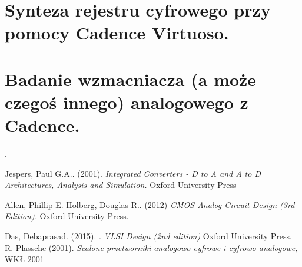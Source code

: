 \documentclass[10pt,a4paper]{report}
\begin{document}
	
	\appendix
	\chapter{Synteza rejestru cyfrowego przy pomocy Cadence Virtuoso.}
	\chapter{Badanie wzmacniacza (a może czegoś innego) analogowego z Cadence.}
	
.
	\begin{thebibliography}{9}
		Jespers, Paul G.A.. (2001). 
		\textit{Integrated Converters - D to A and A to D Architectures, Analysis and Simulation.}
		Oxford University Press
		
		Allen, Phillip E. Holberg, Douglas R.. (2012)  
		\textit{CMOS Analog Circuit Design (3rd Edition). }
		Oxford University Press.
		
		Das, Debaprasad. (2015). .
		\textit{VLSI Design (2nd edition)}
		Oxford University Press.
		R. Plassche (2001). 
		\textit{Scalone przetworniki analogowo-cyfrowe i cyfrowo-analogowe,}
		WKŁ 2001
	\end{thebibliography}
\end{document}
